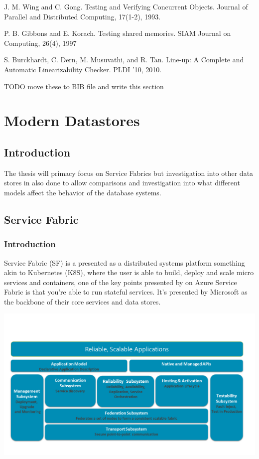 \documentclass[a4paper,10pt,titlepage]{report}
\begin{document}
J. M. Wing and C. Gong. Testing and Verifying
Concurrent Objects. Journal of Parallel and
Distributed Computing, 17(1-2), 1993.

P. B. Gibbons and E. Korach. Testing shared
memories. SIAM Journal on Computing, 26(4), 1997

S. Burckhardt, C. Dern, M. Musuvathi, and R. Tan.
Line-up: A Complete and Automatic Linearizability
Checker. PLDI '10, 2010.


TODO move these to BIB file and write this section





\newpage
\chapter{Modern Datastores}

\section{Introduction}

The thesis will primacy focus on Service Fabrics but investigation into other data stores in also done to allow comparisons and investigation into what different models affect the behavior of the database systems.

\section{Service Fabric}
\subsection{Introduction}

Service Fabric (SF) is a presented as a distributed systems platform something akin to Kubernetes (K8S), where the user is able to build, deploy and scale micro services and containers, one of the key points presented by on Azure Service Fabric is that you're able to run stateful services. It's presented by Microsoft as the backbone of their core services and data stores.\\
\vspace{5mm}

\includegraphics[scale=0.5]{images/service-fabric-architecture.png}
\end{document}
